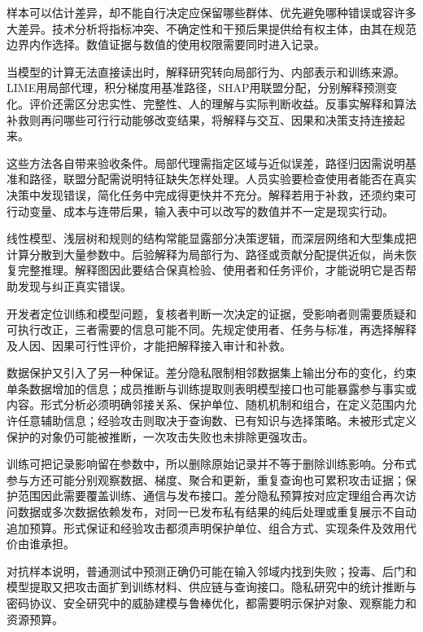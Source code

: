 样本可以估计差异，却不能自行决定应保留哪些群体、优先避免哪种错误或容许多大差异。技术分析将指标冲突、不确定性和干预后果提供给有权主体，由其在规范边界内作选择。数值证据与数值的使用权限需要同时进入记录。

当模型的计算无法直接读出时，解释研究转向局部行为、内部表示和训练来源。LIME用局部代理，积分梯度用基准路径，SHAP用联盟分配，分别解释预测变化。评价还需区分忠实性、完整性、人的理解与实际判断收益。反事实解释和算法补救则再问哪些可行行动能够改变结果，将解释与交互、因果和决策支持连接起来。

这些方法各自带来验收条件。局部代理需指定区域与近似误差，路径归因需说明基准和路径，联盟分配需说明特征缺失怎样处理。人员实验要检查使用者能否在真实决策中发现错误，简化任务中完成得更快并不充分。解释若用于补救，还须约束可行动变量、成本与连带后果，输入表中可以改写的数值并不一定是现实行动。

线性模型、浅层树和规则的结构常能显露部分决策逻辑，而深层网络和大型集成把计算分散到大量参数中。后验解释为局部行为、路径或贡献分配提供近似，尚未恢复完整推理。解释图因此要结合保真检验、使用者和任务评价，才能说明它是否帮助发现与纠正真实错误。

开发者定位训练和模型问题，复核者判断一次决定的证据，受影响者则需要质疑和可执行改正，三者需要的信息可能不同。先规定使用者、任务与标准，再选择解释及人因、因果可行性评价，才能把解释接入审计和补救。

数据保护又引入了另一种保证。差分隐私限制相邻数据集上输出分布的变化，约束单条数据增加的信息；成员推断与训练提取则表明模型接口也可能暴露参与事实或内容。形式分析必须明确邻接关系、保护单位、随机机制和组合，在定义范围内允许任意辅助信息；经验攻击则取决于查询数、已有知识与选择策略。未被形式定义保护的对象仍可能被推断，一次攻击失败也未排除更强攻击。

训练可把记录影响留在参数中，所以删除原始记录并不等于删除训练影响。分布式参与方还可能分别观察数据、梯度、聚合和更新，重复查询也可累积攻击证据；保护范围因此需要覆盖训练、通信与发布接口。差分隐私预算按对应定理组合再次访问数据或多次数据依赖发布，对同一已发布私有结果的纯后处理或重复展示不自动追加预算。形式保证和经验攻击都须声明保护单位、组合方式、实现条件及效用代价由谁承担。

对抗样本说明，普通测试中预测正确仍可能在输入邻域内找到失败；投毒、后门和模型提取又把攻击面扩到训练材料、供应链与查询接口。隐私研究中的统计推断与密码协议、安全研究中的威胁建模与鲁棒优化，都需要明示保护对象、观察能力和资源预算。


